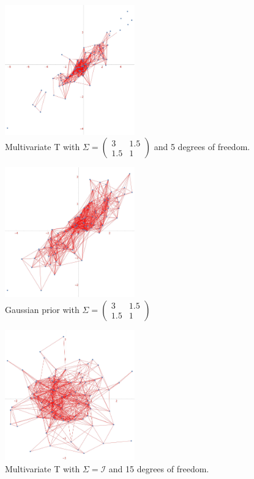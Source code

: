 \documentclass[12pt]{report}
\newcommand{\mc}[1]{\mathcal{#1}}
\begin{document}
\begin{figure}
    \centering
    \includegraphics[width = 0.5\textwidth]{multivariatet_non_diag.jpg}
    \caption[Multivariate T]{Multivariate T with $\Sigma = \begin{pmatrix} 3 & 1.5 \\ 1.5 & 1\end{pmatrix}$ and 5 degrees of freedom.}
\end{figure}

\begin{figure}
    \centering
    \includegraphics[width = 0.5\textwidth]{gaussian_rgg_non_spherical1.jpg}
    \caption[Gaussian non-spherical prior]{Gaussian prior with $\Sigma = \begin{pmatrix} 3 & 1.5 \\ 1.5 & 1\end{pmatrix}$}
\end{figure}

\begin{figure}
    \centering
    \includegraphics[width = 0.5\textwidth]{multivariatet.jpg}
    \caption[Spherical Multivariate T with 15 degrees of freedom]{Multivariate T with $\Sigma = \mc{I}$ and 15 degrees of freedom.}
\end{figure}
\end{document}

